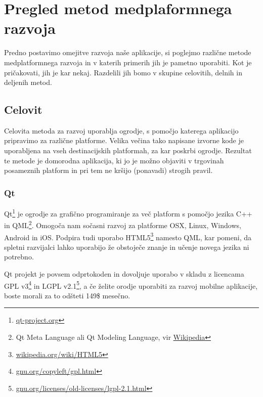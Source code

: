 \graphicspath{{img/}}








\chapter{Pregled metod medplaformnega razvoja}
\label{chap:overview}

Predno postavimo omejitve razvoja naše aplikacije, si poglejmo različne metode medplatformnega razvoja in v katerih primerih jih je pametno uporabiti. Kot je pričakovati, jih je kar nekaj. Razdelili jih bomo v skupine celovitih, delnih in deljenih metod.

\section{Celovit}

Celovita metoda za razvoj uporablja ogrodje, s pomočjo katerega aplikacijo pripravimo za različne platforme. Velika večina tako napisane izvorne kode je uporabljena na vseh destinacijskih platformah, za kar poskrbi ogrodje. Rezultat te metode je domorodna aplikacija, ki jo je možno objaviti v trgovinah posameznih platform in pri tem ne kršijo (ponavadi) strogih pravil.

\subsection{Qt}

Qt\footnote{\href{http://qt-project.org}{qt-project.org}} je ogrodje za grafično programiranje za več platform s pomočjo jezika C++ in QML\footnote{Qt Meta Language ali Qt Modeling Language, vir \href{http://en.wikipedia.org/wiki/QML}{Wikipedia}}. Omogoča nam sočasni razvoj za platforme OSX, Linux, Windows, Android in iOS. Podpira tudi uporabo HTML5\footnote{\href{http://en.wikipedia.org/wiki/HTML5}{wikipedia.org/wiki/HTML5}} namesto QML, kar pomeni, da spletni razvijalci lahko uporabijo že obstoječe znanje in učenje novega jezika ni potrebno.

Qt projekt je povsem odprtokoden in dovoljuje uporabo v skladu z licencama GPL v3\footnote{\href{http://www.gnu.org/copyleft/gpl.html}{gnu.org/copyleft/gpl.html}} in LGPL v2.1\footnote{\href{https://www.gnu.org/licenses/old-licenses/lgpl-2.1.html}{gnu.org/licenses/old-licenses/lgpl-2.1.html}}, a če želite orodje uporabiti za razvoj mobilne aplikacije, boste morali za to odšteti 149\$ mesečno.

